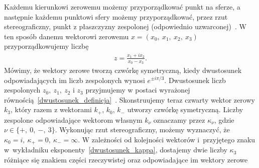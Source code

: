 Każdemu kierunkowi zerowemu możemy przyporządkować punkt na sferze,
a następnie każdemu punktowi sfery \mbox{możemy} przyporządkować,
przez rzut stereograficzny, 
punkt z płaszczyzny zespolonej 
(odpowiednio \mbox{uzwarconej)~\cite{star1993algebra}.}
W ten sposób danemu wektorowi  
zerowemu $x = (x_0,\ x_1,\ x_2,\ x_3)$ 
przyporządkowujemy liczbę
\begin{align*}
z = \frac{x_1+i x_2 }{x_0 - x_3}.
\end{align*}
Mówimy, że wektory zerowe tworzą czwórkę symetryczną,
 kiedy dwustosunek odpowiadających im liczb zespolonych 
 wynosi $e^{\pm i\pi/3}$.  
Dwustosunek liczb zespolonych $z_0,\ z_1,\ z_2$ i $z_3$ przyjmujemy w 
postaci wyrażonej równością~\eqref{dwustosunek_definicja}~\cite{star1993algebra}.
Skonstruujemy teraz czwarty wektor zerowy $k_3$, który razem z 
wektorami $k_+$, $k_0$, $k_-$ utworzy czwórkę symetryczną.
Liczby zespolone odpowiadające wektorom własnym $k_\nu$ oznaczamy
przez $\kappa_\nu$, \mbox{gdzie  $\nu \in \{+,\ 0,\ -,\ 3\}$}. 
Wykonując rzut stereograficzny,
możemy wyznaczyć, że
$ \kappa_0 = i,\ \kappa_+ = 0,\ \kappa_-=\infty $.
W zależności od kolejności wektorów i~przyjętego 
znaku w~wykładniku eksponenty~\eqref{dwustosunek_kappa},
dostajemy dwie liczby $\kappa_3$ różniące się znakiem części 
rzeczywistej oraz odpowiadające im wektory zerowe 
